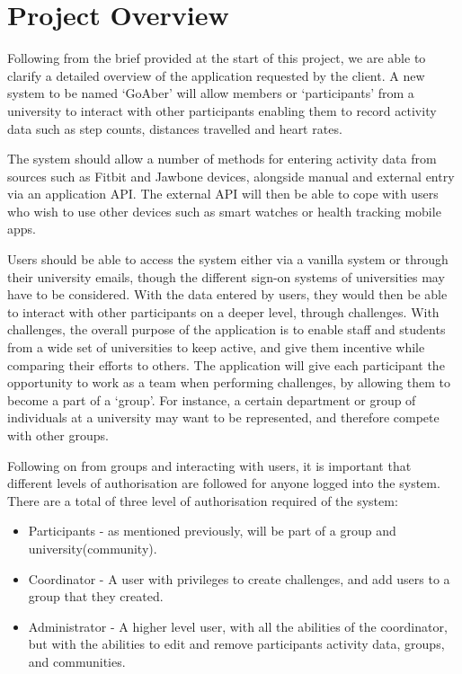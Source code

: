 \chapter{Project Overview}

Following from the brief provided at the start of this project\cite{initialReq}, we are able to clarify a detailed overview of the application requested by the client. A new system to be named `GoAber' will allow members or `participants' from a university to interact with other participants enabling them to record activity data such as step counts, distances travelled and heart rates.\par
The system should allow a number of methods for entering activity data from sources such as Fitbit\cite{fitbit} and Jawbone\cite{jawbone} devices, alongside manual and external entry via an application API. The external API will then be able to cope with users who wish to use other devices such as smart watches or health tracking mobile apps. \par
Users should be able to access the system either via a vanilla system or through their university emails, though the different sign-on systems of universities may have to be considered. With the data entered by users, they would then be able to interact with other participants on a deeper level, through challenges. With challenges, the overall purpose of the application is to enable staff and students from a wide set of universities to keep active, and give them incentive while comparing their efforts to others. The application will give each participant the opportunity to work as a team when performing challenges, by allowing them to become a part of a `group'. For instance, a certain department or group of individuals at a university may want to be represented, and therefore compete with other groups. \par
Following on from groups and interacting with users, it is important that different levels of authorisation are followed for anyone logged into the system. There are a total of three level of authorisation required of the system:
\begin{itemize}
\item Participants - as mentioned previously, will be part of a group and university(community).
\item Coordinator - A user with privileges to create challenges, and add users to a group that they created.
\item Administrator - A higher level user, with all the abilities of the coordinator, but with the abilities to edit and remove participants activity data, groups, and communities.
\end{itemize}
